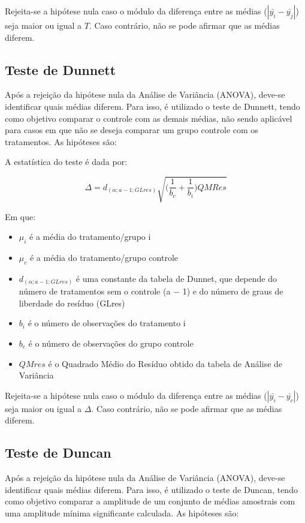 \documentclass[
  portuguese,
]{estat/estat}
\begin{document}
Rejeita-se a hipótese nula caso o módulo da diferença entre as médias
(\(|\bar{y_i} - \bar{y_j}|\)) seja maior ou igual a \(T\). Caso
contrário, não se pode afirmar que as médias diferem.

\subsection{Teste de Dunnett}\label{teste-de-dunnett}

Após a rejeição da hipótese nula da Análise de Variância (ANOVA),
deve-se identificar quais médias diferem. Para isso, é utilizado o teste
de Dunnett, tendo como objetivo comparar o controle com as demais
médias, não sendo aplicável para casos em que não se deseja comparar um
grupo controle com os tratamentos. As hipóteses são:


A estatística do teste é dada por:

\[\Delta = d_{(\alpha;a-1;GLres)} \sqrt{\Big( \frac{1}{b_c} + \frac{1}{b_i} \Big) QMRes}\]

Em que:

\begin{itemize}
\item
  \(\mu_i\) é a média do tratamento/grupo i
\item
  \(\mu_c\) é a média do tratamento/grupo controle
\item
  \(d_{(\alpha;a-1;GLres)}\) é uma constante da tabela de Dunnet, que
  depende do número de tratamentos sem o controle (a − 1) e do número de
  graus de liberdade do resíduo (GLres)
\item
  \(b_i\) é o número de observações do tratamento i
\item
  \(b_c\) é o número de observações do grupo controle
\item
  \(QMres\) é o Quadrado Médio do Resíduo obtido da tabela de Análise de
  Variância
\end{itemize}

Rejeita-se a hipótese nula caso o módulo da diferença entre as médias
(\(|\bar{y_i} - \bar{y_c}|\)) seja maior ou igual a \(\Delta\). Caso
contrário, não se pode afirmar que as médias diferem.

\subsection{Teste de Duncan}\label{teste-de-duncan}

Após a rejeição da hipótese nula da Análise de Variância (ANOVA),
deve-se identificar quais médias diferem. Para isso, é utilizado o teste
de Duncan, tendo como objetivo comparar a amplitude de um conjunto de
médias amostrais com uma amplitude mínima significante calculada. As
hipóteses são:
\end{document}

